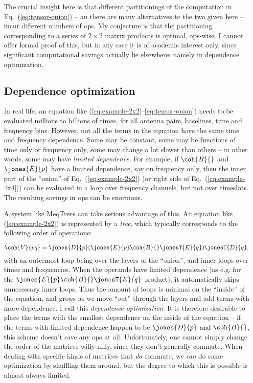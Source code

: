 The crucial insight here is that different partitionings of the computation in Eq.~(\ref{eq:tensor-onion}) -- an there are many alternatives to the two given here -- incur different numbers of ops.  My conjecture is that the partitioning corresponding to a series of $2\times2$ matrix products is optimal, ops-wise. I cannot offer formal proof of this, but in any case it is of academic interest only, since significant computational savings actually lie elsewhere: namely in dependence optimization.

\subsection{Dependence optimization}

In real life, an equation like (\ref{eq:example-2x2}--\ref{eq:tensor-onion}) needs to be evaluated millions to billions of times, for all antenna pairs, baselines, time and frequency bins. However, not all the terms in the equation have the same time and frequency dependence. Some may be constant, some may be functions of time only or frequency only, some may change a lot slower than others -- in other words, some may have \emph{limited dependence}. For example, if $\coh{B}{}$ and $\jones{E}{p}$ have a limited dependence, say on frequency only, then the inner part of the ``onion'' of Eq.~(\ref{eq:example-2x2}) (or right side of Eq.~(\ref{eq:example-4x4})) can be evaluated in a loop over frequency channels, but not over timeslots. The resulting savings in ops can be enormous.

A system like MeqTrees \citep{meqtrees} can take serious advantage of this. An equation like (\ref{eq:example-2x2}) is represented by a \emph{tree}, which typically corresponds to the following order of operations:

\[
  \coh{V}{pq} =  \jones{D}{p}(\jones{E}{p} \coh{B}{} \jonesT{E}{q} ) \jonesT{D}{q}, \\
\]
with an outermost loop being over the layers of the ``onion'', and inner loops over times and frequencies. When the operands have limited dependence (as e.g. for the $\jones{E}{p} \coh{B}{} \jonesT{E}{q}$ product), it automatically skips unnecessary inner loops. Thus the amount of loops is minimal on the ``inside'' of the equation, and grows as we move ``out'' through the layers and add terms with more dependence. I call this \emph{dependence optimization}. It is therefore desirable to place the terms with the smallest dependence on the inside of the equation -- if the terms with limited dependence happen to be $\jones{D}{p}$ and $\coh{B}{}$, this scheme doesn't save any ops at all. Unfortunately, one cannot simply change the order of the matrices willy-nilly, since they don't generally commute.  When dealing with specific kinds of matrices that \emph{do\/} commute, we \emph{can} do some optimization by shuffling them around, but the degree to which this is possible is almost always limited.

